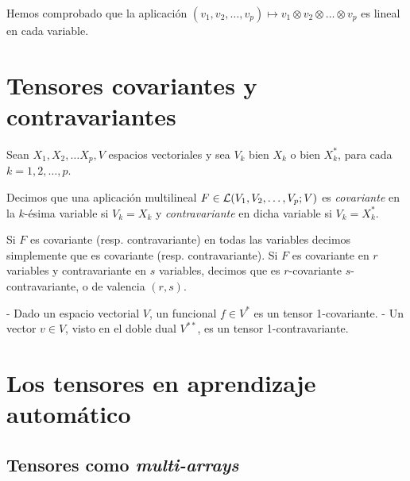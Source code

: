 Hemos comprobado que la aplicación
\((v_1,v_2,\dots,v_p)\mapsto v_1\otimes v_2\otimes\dots\otimes v_p\) es
lineal en cada variable. \reme

\section{Tensores covariantes y
contravariantes}\label{tensores-covariantes-y-contravariantes}

Sean \(X_1,X_2,\dots X_p,V\) espacios vectoriales y sea \(V_k\) bien
\(X_k\) o bien \(X_k^*\), para cada \(k=1,2,\dots,p\).

Decimos que una aplicación multilineal \(F\in \mathcal{L}(V_1,V_2,\dots,V_p;V)\)
es \emph{covariante} en la \(k\)-ésima variable si \(V_k=X_k\) y
\emph{contravariante} en dicha variable si \(V_k=X_k^*\).

Si \(F\) es covariante (resp. contravariante) en todas las variables
decimos simplemente que es covariante (resp. contravariante). Si \(F\)
es covariante en \(r\) variables y contravariante en \(s\) variables,
decimos que es \(r\)-covariante \(s\)-contravariante, o de valencia
\((r, s)\). 

\exampleb
- Dado un espacio vectorial \(V\), un funcional \(f\in V^*\) es un
tensor 1-covariante. - Un vector \(v\in V\), visto en el doble dual
\(V^{**}\), es un tensor 1-contravariante. \examplee

\section{Los tensores en aprendizaje
automático}\label{los-tensores-en-aprendizaje-automuxe1tico}

\subsection{\texorpdfstring{Tensores como
\emph{multi-arrays}}{Tensores como multi-arrays}}\label{tensores-como-multi-arrays}
